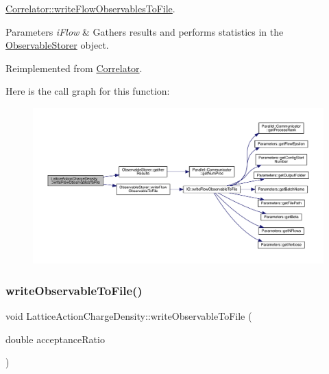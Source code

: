 \mbox{\hyperlink{class_correlator_a168512b2ce182d9478db47f100125fa6}{Correlator\+::write\+Flow\+Observables\+To\+File}}. 


\begin{DoxyParams}{Parameters}
{\em i\+Flow} & Gathers results and performs statistics in the \mbox{\hyperlink{class_observable_storer}{Observable\+Storer}} object. \\
\hline
\end{DoxyParams}


Reimplemented from \mbox{\hyperlink{class_correlator_a168512b2ce182d9478db47f100125fa6}{Correlator}}.

Here is the call graph for this function\+:
\nopagebreak
\begin{figure}[H]
\begin{center}
\leavevmode
\includegraphics[width=350pt]{class_lattice_action_charge_density_a54226556dc1497c311e4a4d50bf44c26_cgraph}
\end{center}
\end{figure}
\mbox{\label{class_lattice_action_charge_density_a719f71aaccbf1b4147ea944781d69908}} 
\subsubsection{\texorpdfstring{writeObservableToFile()}{writeObservableToFile()}}
{\footnotesize\ttfamily void Lattice\+Action\+Charge\+Density\+::write\+Observable\+To\+File (\begin{DoxyParamCaption}\item[{double}]{acceptance\+Ratio }\end{DoxyParamCaption})\hspace{0.3cm}{\ttfamily [virtual]}}



